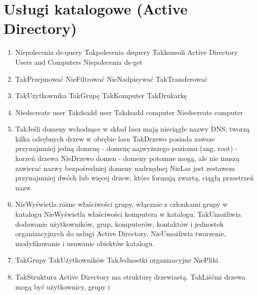 \section{Usługi katalogowe (Active Directory)}
	\begin{enumerate}
		\item {}%
		{Nie}{polecenia ds-query}%
		{Tak}{polecenia dsquery}%
		{Tak}{konsoli Active Directory Users and Computers}%
		{Nie}{polecenia ds-get}
		\item {}%
		{Tak}{Przejmować}%
		{Nie}{Filtrować}%
		{Nie}{Nadpisywać}%
		{Tak}{Transferować}
		\item {}%
		{Tak}{Użytkownika}%
		{Tak}{Grupę}%
		{Tak}{Komputer}%
		{Tak}{Drukarkę}
		\item {}%
		{Nie}{dscreate user}%
		{Tak}{dsadd user}%
		{Tak}{dsadd computer}%
		{Nie}{dscreate computer}
		\item {}%
		{Tak}{Jeśli domeny wchodzące w skład lasu mają nieciągłe nazwy DNS, tworzą kilka odrębnych drzew w obrębie lasu}%
		{Tak}{Drzewo posiada zawsze przynajmniej jedną domenę - domenę najwyższego poziomu (ang. root) - korzeń drzewa}%
		{Nie}{Drzewo domen - domeny potomne mogą, ale nie muszą zawierać nazwy bezpośredniej domeny nadrzędnej}%
		{Nie}{Las jest zestawem przynajmniej dwóch lub więcej drzew, które formują zwartą, ciągłą przestrzeń nazw.}
		\newpage
		\item {}%
		{Nie}{Wyświetla różne właściwości grupy, włącznie z członkami grupy w katalogu}%
		{Nie}{Wyświetla właściwości komputera w katalogu.}%
		{Tak}{Umożliwia dodawanie użytkowników, grup, komputerów, kontaktów i jednostek organizacyjnych do usługi Active Directory.}%
		{Nie}{Umożliwia tworzenie, modyfikowanie i usuwanie obiektów katalogu.}
		\item {}%
		{Tak}{Grupy}%
		{Tak}{Użytkowników}%
		{Tak}{Jednostki organizacyjne}%
		{Nie}{Pliki}
		\item {}%
		{Tak}{Struktura Active Directory ma strukturę drzewiastą.}%
		{Tak}{Liśćmi drzewa mogą być użytkownicy, grupy i }%

\end{enumerate}
